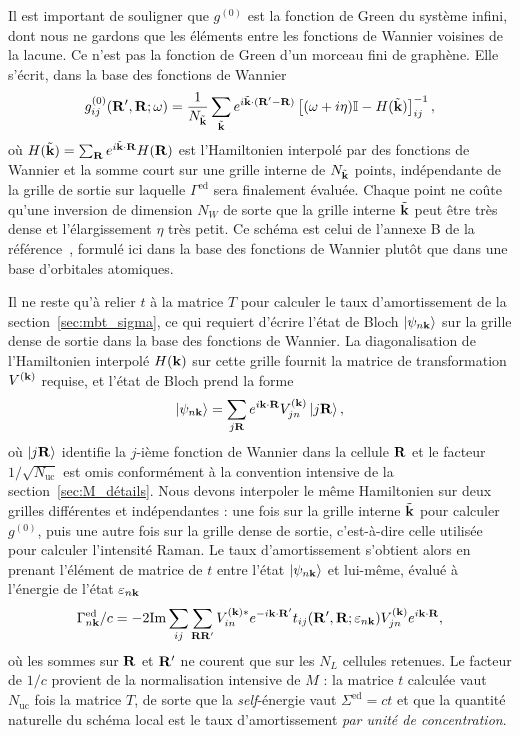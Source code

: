 Il est important de souligner que $g^{(0)}$ est la fonction de Green du système infini, dont nous ne gardons que les éléments entre les fonctions de Wannier voisines de la lacune. Ce n'est pas la fonction de Green d'un morceau fini de graphène. Elle s'écrit, dans la base des fonctions de Wannier
\begin{equation}
g^{(0)}_{ij}(\mathbf{R}',\mathbf{R};\omega) = \frac{1}{N_{\tilde{\mathbf{k}}}}\sum_{\tilde {\mathbf{k}}} e^{i\tilde{\mathbf{k}}\cdot(\mathbf{R}'-\mathbf{R})}\left[(\omega+i\eta)\mathbb{I}-H(\tilde{\mathbf{k}})\right]^{-1}_{ij},\label{eqn:g_loc}
\end{equation}
où $H(\tilde{\mathbf{k}})=\sum_{\mathbf{R}} e^{i\tilde{\mathbf{k}}\cdot\mathbf{R}}H(\mathbf{R})$ est l'Hamiltonien interpolé par des fonctions de Wannier et la somme court sur une grille interne de $N_{\tilde{\mathbf{k}}}$ points, indépendante de la grille de sortie sur laquelle $\Gamma^\text{ed}$ sera finalement évaluée. Chaque point ne coûte qu'une inversion de dimension $N_W$ de sorte que la grille interne $\tilde{\mathbf{k}}$ peut être très dense et l'élargissement $\eta$ très petit. Ce schéma est celui de l'annexe B de la référence~\cite{kaasbjergAtomisticMatrixTheory2020}, formulé ici dans la base des fonctions de Wannier plutôt que dans une base d'orbitales atomiques.

Il ne reste qu'à relier $t$ à la matrice $T$ pour calculer le taux d'amortissement de la section~\ref{sec:mbt_sigma}, ce qui requiert d'écrire l'état de Bloch $\ket{\psi_{n\mathbf{k}}}$ sur la grille dense de sortie dans la base des fonctions de Wannier. La diagonalisation de l'Hamiltonien interpolé $H(\mathbf{k})$ sur cette grille fournit la matrice de transformation $V^{(\mathbf{k})}$ requise, et l'état de Bloch prend la forme
\begin{equation}
    \ket{\psi_{n\mathbf{k}}} = \sum_{j\mathbf{R}} e^{i\mathbf{k}\cdot\mathbf{R}}V^{(\mathbf{k})}_{jn}\ket{j\mathbf{R}},\label{eqn:Bloch_Wannier}
\end{equation}
où $\ket{j\mathbf{R}}$ identifie la $j$-ième fonction de Wannier dans la cellule $\mathbf{R}$ et le facteur $1/\sqrt{N_\text{uc}}$ est omis conformément à la convention intensive de la section~\ref{sec:M_détails}. Nous devons interpoler le même Hamiltonien sur deux grilles différentes et indépendantes : une fois sur la grille interne $\tilde{\mathbf{k}}$ pour calculer $g^{(0)}$, puis une autre fois sur la grille dense de sortie, c'est-à-dire celle utilisée pour calculer l'intensité Raman. Le taux d'amortissement s'obtient alors en prenant l'élément de matrice de $t$ entre l'état $\ket{\psi_{n\mathbf{k}}}$ et lui-même, évalué à l'énergie de l'état $\varepsilon_{n\mathbf{k}}$
\begin{equation}
    \Gamma_{n\mathbf{k}}^\text{ed}/c = -2\mathrm{Im}\sum_{ij}\sum_{\mathbf{R}\mathbf{R}'}V_{in}^{(\mathbf{k})*}e^{-i\mathbf{k}\cdot\mathbf{R}'}t_{ij}(\mathbf{R}',\mathbf{R};\varepsilon_{n\mathbf{k}})V^{(\mathbf{k})}_{jn}e^{i\mathbf{k}\cdot\mathbf{R}},\label{eqn:gamma_loc}
\end{equation}
où les sommes sur $\mathbf{R}$ et $\mathbf{R}'$ ne courent que sur les $N_L$ cellules retenues. Le facteur de $1/c$ provient de la normalisation intensive de $M$ : la matrice $t$ calculée vaut $N_\text{uc}$ fois la matrice $T$, de sorte que la \textit{self}-énergie vaut $\Sigma^{\text{ed}}=ct$ et que la quantité naturelle du schéma local est le taux d'amortissement \textit{par unité de concentration}.

